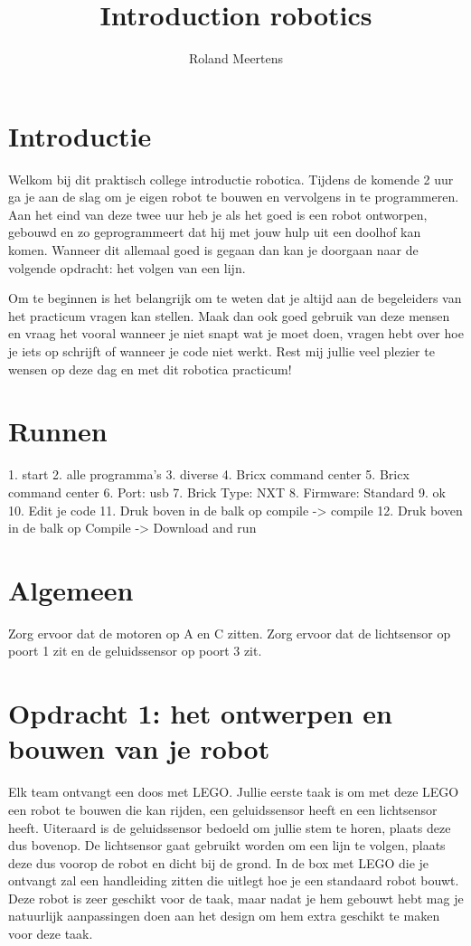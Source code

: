 \documentclass[11pt]{article} %
\title{Introduction robotics}
\author{Roland Meertens}
\begin{document}
\maketitle
\section{Introductie}
Welkom bij dit praktisch college introductie robotica. 
Tijdens de komende 2 uur ga je aan de slag om je eigen robot te bouwen en vervolgens in te programmeren. 
Aan het eind van deze twee uur heb je als het goed is een robot ontworpen, gebouwd en zo geprogrammeert dat hij met jouw hulp uit een doolhof kan komen. 
Wanneer dit allemaal goed is gegaan dan kan je doorgaan naar de volgende opdracht: het volgen van een lijn. 

Om te beginnen is het belangrijk om te weten dat je altijd aan de begeleiders van het practicum vragen kan stellen.
Maak dan ook goed gebruik van deze mensen en vraag het vooral wanneer je niet snapt wat je moet doen, vragen hebt over hoe je iets op schrijft of wanneer je code niet werkt. 
Rest mij jullie veel plezier te wensen op deze dag en met dit robotica practicum!

\section{Runnen}
1. start
2. alle programma's
3. diverse
4. Bricx command center
5. Bricx command center
6. Port: usb
7. Brick Type: NXT
8. Firmware: Standard
9. ok
10. Edit je code
11. Druk boven in de balk op compile -> compile
12. Druk boven in de balk op Compile -> Download and run


\section{Algemeen}
Zorg ervoor dat de motoren op A en C zitten. 
Zorg ervoor dat de lichtsensor op poort 1 zit en de geluidssensor op poort 3 zit. 
\section{Opdracht 1: het ontwerpen en bouwen van je robot}
Elk team ontvangt een doos met LEGO. 
Jullie eerste taak is om met deze LEGO een robot te bouwen die kan rijden, een geluidssensor heeft en een lichtsensor heeft. 
Uiteraard is de geluidssensor bedoeld om jullie stem te horen, plaats deze dus bovenop. 
De lichtsensor gaat gebruikt worden om een lijn te volgen, plaats deze dus voorop de robot en dicht bij de grond. 
In de box met LEGO die je ontvangt zal een handleiding zitten die uitlegt hoe je een standaard robot bouwt. 
Deze robot is zeer geschikt voor de taak, maar nadat je hem gebouwt hebt mag je natuurlijk aanpassingen doen aan het design om hem extra geschikt te maken voor deze taak. 
\end{document}

